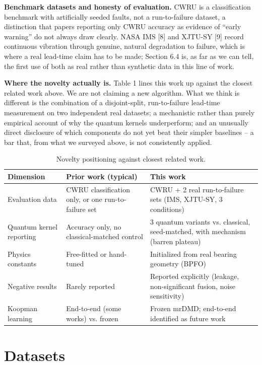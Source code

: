 \documentclass[3p,times,procedia]{elsarticle}
\begin{document}
\textbf{Benchmark datasets and honesty of evaluation.} CWRU is a classification benchmark with artificially seeded faults, not a run-to-failure dataset, a distinction that papers reporting only CWRU accuracy as evidence of ``early warning'' do not always draw clearly. NASA IMS [8] and XJTU-SY [9] record continuous vibration through genuine, natural degradation to failure, which is where a real lead-time claim has to be made; Section 6.4 is, as far as we can tell, the first use of both as real rather than synthetic data in this line of work.

\textbf{Where the novelty actually is.} Table 1 lines this work up against the closest related work above. We are not claiming a new algorithm. What we think is different is the combination of a disjoint-split, run-to-failure lead-time measurement on two independent real datasets; a mechanistic rather than purely empirical account of why the quantum kernels underperform; and an unusually direct disclosure of which components do not yet beat their simpler baselines -- a bar that, from what we surveyed above, is not consistently applied.

\begin{table}[ht]
\caption{Novelty positioning against closest related work.}
\centering
\begin{tabular}{p{3cm} p{5cm} p{5cm}}
\toprule
\textbf{Dimension} & \textbf{Prior work (typical)} & \textbf{This work} \\
\midrule
Evaluation data & CWRU classification only, or one run-to-failure set & CWRU + 2 real run-to-failure sets (IMS, XJTU-SY, 3 conditions) \\
Quantum kernel reporting & Accuracy only, no classical-matched control & 3 quantum variants vs. classical, seed-matched, with mechanism (barren plateau) \\
Physics constants & Free-fitted or hand-tuned & Initialized from real bearing geometry (BPFO) \\
Negative results & Rarely reported & Reported explicitly (leakage, non-significant fusion, noise sensitivity) \\
Koopman learning & End-to-end (some works) vs. frozen & Frozen mrDMD; end-to-end identified as future work \\
\bottomrule
\end{tabular}
\end{table}

\section{Datasets}
\end{document}
